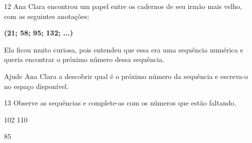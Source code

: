 
\num{12} Ana Clara encontrou um papel entre os cadernos de seu irmão mais velho, com as seguintes anotações:

\begin{myquote}
\centering
\textbf{(21; 58; 95; 132; ...)}
\end{myquote}

Ela ficou muito curiosa, pois entendeu que essa era uma sequência
numérica e queria encontrar o próximo número dessa sequência.

Ajude Ana Clara a descobrir qual é o próximo número da sequência e escreva-o no espaço disponível.

\num{13} Observe as sequências e complete-as com os números que estão faltando.

\begin{escolha}
\item 102 \quad {} \quad {} 110 \quad {}

\item 85 \quad {} \quad {}   \quad {}
\end{escolha}


